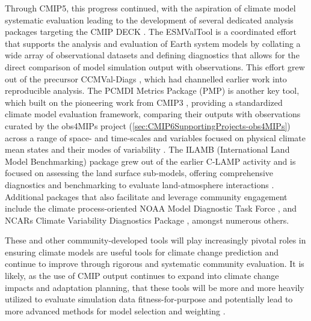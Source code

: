 \documentclass[manuscript]{copernicus}
\begin{document}
Through CMIP5, this progress continued, with the aspiration of climate model systematic evaluation leading to the development of several dedicated analysis packages targeting the CMIP DECK \citep{eyring_towards_2016}. The ESMValTool \citep[Earth System Model Evaluation Tool;][]{eyring_esmvaltool_2016,righi_earth_2020,eyring_earth_2020} is a coordinated effort that supports the analysis and evaluation of Earth system models by collating a wide array of observational datasets and defining diagnostics that allows for the direct comparison of model simulation output with observations. This effort grew out of the precursor CCMVal-Diags \citep[Chemistry-Climate Model Validation Diagnostic tool;][]{gettelman_community_2012}, which had channelled earlier work \citep{eyring_assessment_2006,waugh_quantitative_2008} into reproducible analysis. The PCMDI Metrics Package (PMP) is another key tool, which built on the pioneering work from CMIP3 \citep{gleckler_performance_2008}, providing a standardized climate model evaluation framework, comparing their outputs with observations curated by the obs4MIPs project (\autoref{sec:CMIP6SupportingProjects-obs4MIPs}) across a range of space- and time-scales and variables focused on physical climate mean states and their modes of variability \citep{gleckler_more_2016,lee_systematic_2024}. The ILAMB (International Land Model Benchmarking) package grew out of the earlier C-LAMP activity \citep{hoffman_results_2007} and is focused on assessing the land surface sub-models, offering comprehensive diagnostics and benchmarking to evaluate land-atmosphere interactions \citep{collier_international_2018}. Additional packages that also facilitate and leverage community engagement include the climate process-oriented NOAA Model Diagnostic Task Force \citep[NOAA-MDTF;][]{neelin_process-oriented_2023}, and NCARs Climate Variability Diagnostics Package \citep[CVDP;][]{phillips_evaluating_2014}, amongst numerous others.

These and other community-developed tools \citep[e.g.,][]{hoffman_systematic_2025} will play increasingly pivotal roles in ensuring climate models are useful tools for climate change prediction and continue to improve through rigorous and systematic community evaluation. It is likely, as the use of CMIP output continues to expand into climate change impacts and adaptation planning, that these tools will be more and more heavily utilized to evaluate simulation data fitness-for-purpose and potentially lead to more advanced methods for model selection and weighting \citep{eyring_taking_2019}.
\end{document}
